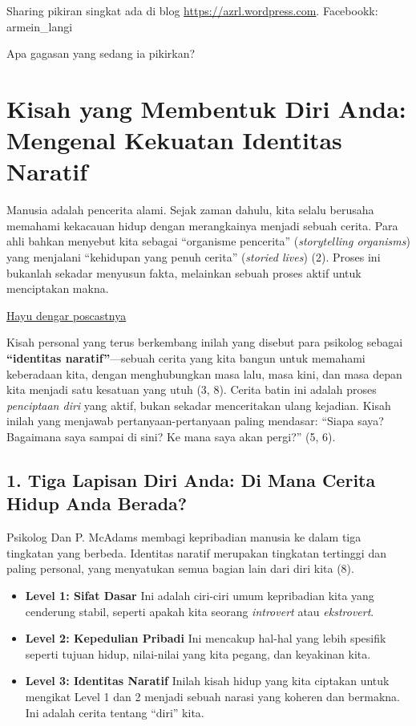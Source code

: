 \documentclass[
  letterpaper,
  DIV=11,
  numbers=noendperiod]{scrreprt}
\begin{document}
Sharing pikiran singkat ada di blog \url{https://azrl.wordpress.com}.
Facebookk: armein\_langi

Apa gagasan yang sedang ia pikirkan?

\section{\texorpdfstring{\textbf{Kisah yang Membentuk Diri Anda:
Mengenal Kekuatan Identitas
Naratif}}{Kisah yang Membentuk Diri Anda: Mengenal Kekuatan Identitas Naratif}}\label{kisah-yang-membentuk-diri-anda-mengenal-kekuatan-identitas-naratif}

Manusia adalah pencerita alami. Sejak zaman dahulu, kita selalu berusaha
memahami kekacauan hidup dengan merangkainya menjadi sebuah cerita. Para
ahli bahkan menyebut kita sebagai ``organisme pencerita''
(\emph{storytelling organisms}) yang menjalani ``kehidupan yang penuh
cerita'' (\emph{storied lives}) (2). Proses ini bukanlah sekadar
menyusun fakta, melainkan sebuah proses aktif untuk menciptakan makna.

\href{./audio/Identitas_Naratif__Jadi_Sutradara_dan_Penulis_Kisah_Hidup_Anda_.mp4}{Hayu
dengar poscastnya}

Kisah personal yang terus berkembang inilah yang disebut para psikolog
sebagai \textbf{``identitas naratif''}---sebuah cerita yang kita bangun
untuk memahami keberadaan kita, dengan menghubungkan masa lalu, masa
kini, dan masa depan kita menjadi satu kesatuan yang utuh (3, 8). Cerita
batin ini adalah proses \emph{penciptaan diri} yang aktif, bukan sekadar
menceritakan ulang kejadian. Kisah inilah yang menjawab
pertanyaan-pertanyaan paling mendasar: ``Siapa saya? Bagaimana saya
sampai di sini? Ke mana saya akan pergi?'' (5, 6).

\subsection{\texorpdfstring{\textbf{1. Tiga Lapisan Diri Anda: Di Mana
Cerita Hidup Anda
Berada?}}{1. Tiga Lapisan Diri Anda: Di Mana Cerita Hidup Anda Berada?}}\label{tiga-lapisan-diri-anda-di-mana-cerita-hidup-anda-berada}

Psikolog Dan P. McAdams membagi kepribadian manusia ke dalam tiga
tingkatan yang berbeda. Identitas naratif merupakan tingkatan tertinggi
dan paling personal, yang menyatukan semua bagian lain dari diri kita
(8).

\begin{itemize}
\item
  \textbf{Level 1: Sifat Dasar} Ini adalah ciri-ciri umum kepribadian
  kita yang cenderung stabil, seperti apakah kita seorang
  \emph{introvert} atau \emph{ekstrovert}.
\item
  \textbf{Level 2: Kepedulian Pribadi} Ini mencakup hal-hal yang lebih
  spesifik seperti tujuan hidup, nilai-nilai yang kita pegang, dan
  keyakinan kita.
\item
  \textbf{Level 3: Identitas Naratif} Inilah kisah hidup yang kita
  ciptakan untuk mengikat Level 1 dan 2 menjadi sebuah narasi yang
  koheren dan bermakna. Ini adalah cerita tentang ``diri'' kita.
\end{itemize}
\end{document}
